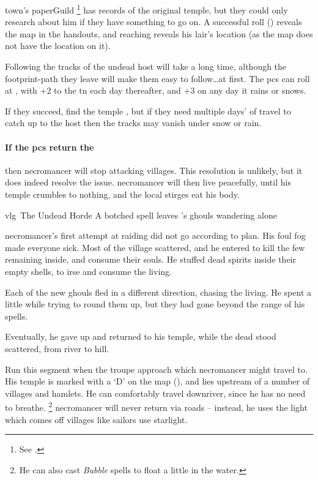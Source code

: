 \Gls{town}'s \gls{paperGuild}%
\footnote{See .}
has records of the original temple, but they could only research about him if they have something to go on.
A successful  roll (\tn[12]) reveals the map in the handouts, and reaching \tn[14] reveals his lair's location (as the map does not have the location on it).

Following the tracks of the undead host will take a long time, although the footprint-path they leave will make them easy to follow\ldots at first.
The \glspl{pc} can roll  at \tn[5], with +2 to the \gls{tn} each day thereafter, and +3 on any day it rains or snows.

If they succeed, find the temple , but if they need multiple days' of travel to catch up to the host then the tracks may vanish under snow or rain.

\paragraph{If the \glspl{pc} return the }
then \gls{necromancer} will stop attacking \glspl{village}.
This resolution is unlikely, but it does indeed resolve the issue.
\Gls{necromancer} will then live peacefully, until his temple crumbles to nothing, and the local stirges eat his body.

{\gls{vlg}~The Undead Horde}%
{A botched spell leaves 's ghouls wandering alone}%
\label{necroHorde}

\begin{exampletext}
  \Gls{necromancer}'s first attempt at raiding  did not go according to plan.
  His foul fog made everyone sick.
  Most of the \gls{village} scattered, and he entered to kill the few remaining inside, and consume their souls.
  He stuffed dead spirits inside their empty shells, to irse and consume the living.

  Each of the new ghouls fled in a different direction, chasing the living.
  He spent a little while trying to round them up, but they had gone beyond the range of his spells.

  Eventually, he gave up and returned to his temple, while the dead stood scattered, from river to hill.
\end{exampletext}

Run this \gls{segment} when the troupe approach  which \gls{necromancer} might travel to.
His temple is marked with a `\gls{D}' on the map (), and lies upstream of a number of \glspl{village} and hamlets.
He can comfortably travel downriver, since he has no need to breathe.%
\footnote{He can also cast \textit{Bubble} spells to float a little in the water.}
\Gls{necromancer} will never return via roads -- instead, he uses the light which comes off \glspl{village} like sailors use starlight.

